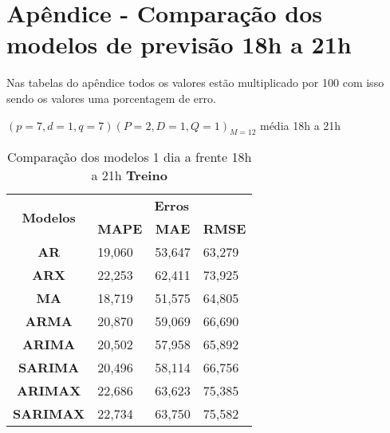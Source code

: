 
\section{Ap\^endice - Compara\c c\~ao dos modelos de previs\~ao 18h a 21h}\label{sec:comtb18}

Nas tabelas do apêndice todos os valores estão multiplicado por 100 com isso sendo os valores uma porcentagem de erro.

	$(p = 7,d = 1,q = 7) (P = 2,D = 1,Q = 1)_{M = 12}$ média 18h a 21h
	\begin{table}[H]
		\centering
		\caption{Comparação dos modelos 1 dia a frente 18h a 21h \textbf{Treino} }\label{tb:1-18trn}
\begin{tabular}{@{}clll@{}}
	\toprule
	\multirow{2}{*}{\textbf{Modelos}} & \multicolumn{3}{c}{\textbf{Erros}}                                                                       \\ \cmidrule(l){2-4} 
	& \multicolumn{1}{c}{\textbf{MAPE}} & \multicolumn{1}{c}{\textbf{MAE}} & \multicolumn{1}{c}{\textbf{RMSE}} \\ \hline
	\textbf{AR}                       & 19,060                            & 53,647                           & 63,279                            \\
	\textbf{ARX}                      & 22,253                            & 62,411                           & 73,925                            \\
	\textbf{MA}                       & 18,719                            & 51,575                           & 64,805                            \\
	\textbf{ARMA}                     & 20,870                            & 59,069                           & 66,690                            \\
	\textbf{ARIMA}                    & 20,502                            & 57,958                           & 65,892                            \\
	\textbf{SARIMA}                   & 20,496                            & 58,114                           & 66,756                            \\
	\textbf{ARIMAX}                   & 22,686                            & 63,623                           & 75,385                            \\
	\textbf{SARIMAX}                  & 22,734                            & 63,750                           & 75,582                            \\

\end{tabular}
\end{table}
